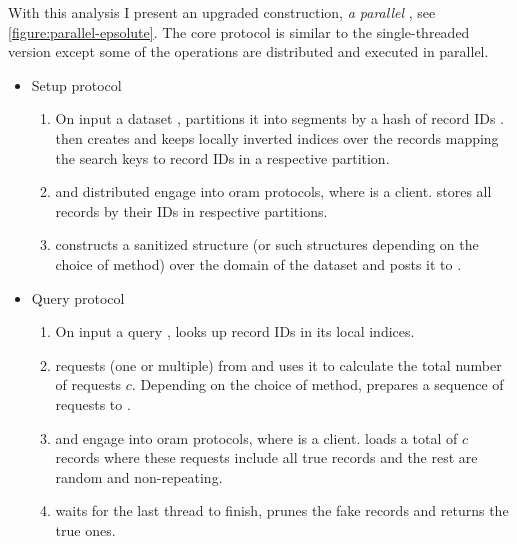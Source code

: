 				With this analysis I present an upgraded construction, \emph{a parallel \epsolute{}}, see \cref{figure:parallel-epsolute}.
				The core protocol is similar to the single-threaded version except some of the operations are distributed and executed in parallel.
				\begin{itemize}
					\item
						Setup protocol \protocolSetup{}
						\begin{enumerate}
							\item
								On input a dataset \database{}, \user{} partitions it into \oramsNumber{} segments  by a hash of record IDs \recordID{}.
								\user{} then creates and keeps locally \oramsNumber{} inverted indices over the records mapping the search keys \searchKey{} to record IDs \recordID{} in a respective partition.
							\item
								\user{} and distributed \server{} engage into \oramsNumber{} \acrshort{oram} protocols, where \user{} is a client.
								\user{} stores all records by their IDs in respective \server{} partitions.
							\item
								\user{} constructs a sanitized structure \serverDS{} (or \oramsNumber{} such structures depending on the choice of method) over the domain of the dataset and posts it to \server{}.
						\end{enumerate}
					\item
						Query protocol \protocolQuery{}
						\begin{enumerate}
							\item
								On input a query \query{}, \user{} looks up record IDs in its local indices.
							\item
								\user{} requests \serverDS{} (one or multiple) from \server{} and uses it to calculate the total number of requests $c$.
								Depending on the choice of method, \user{} prepares a sequence of requests to \server{}.
							\item
								\user{} and \server{} engage into \oramsNumber{} \acrshort{oram} protocols, where \user{} is a client.
								\user{} loads a total of $c$ records where these requests include all true records and the rest are random and non-repeating.
							\item
								\user{} waits for the last thread to finish, prunes the fake records and returns the true ones.
						\end{enumerate}
				\end{itemize}

